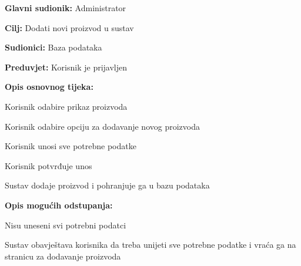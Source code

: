 					\noindent {}
					\begin{packed_item}
						
						\item \textbf{Glavni sudionik:} Administrator
						\item  \textbf{Cilj:} Dodati novi proizvod u sustav
						\item  \textbf{Sudionici:} Baza podataka
						\item  \textbf{Preduvjet:} Korisnik je prijavljen
						\item  \textbf{Opis osnovnog tijeka:}
						
						\item[] \begin{packed_enum}
							
							\item Korisnik odabire prikaz proizvoda
							\item Korisnik odabire opciju za dodavanje novog proizvoda
							\item Korisnik unosi sve potrebne podatke
							\item Korisnik potvrđuje unos
							\item Sustav dodaje proizvod i pohranjuje ga u bazu podataka
							
						\end{packed_enum}
						
						\item  \textbf{Opis mogućih odstupanja:}
						
						\item[] \begin{packed_item}
							
							\item[4.a] Nisu uneseni svi potrebni podatci
							\item[] \begin{packed_enum}
								
								\item Sustav obavještava korisnika da treba unijeti sve potrebne podatke i vraća ga na stranicu za dodavanje proizvoda
								
							\end{packed_enum}
							
						\end{packed_item}	
							
					\end{packed_item}
				
